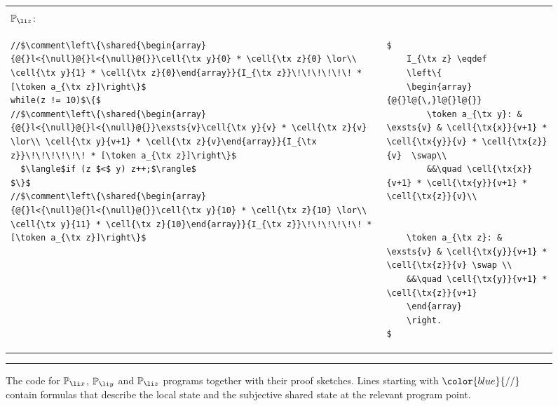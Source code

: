 \begin{figure}
\begin{tabular}{@{} l @{\hspace{15pt}} l@{\ }}
&\vspace{-5pt}\\
{$\mathbb{P}_{\li z}$:}&  \vspace{-10pt}\\
\begin{lstlisting}
//$\comment\left\{\shared{\begin{array}{@{}l<{\null}@{}l<{\null}@{}}\cell{\tx y}{0} * \cell{\tx z}{0} \lor\\ \cell{\tx y}{1} * \cell{\tx z}{0}\end{array}}{I_{\tx z}}\!\!\!\!\!\! * [\token a_{\tx z}]\right\}$
while(z != 10)$\{$
//$\comment\left\{\shared{\begin{array}{@{}l<{\null}@{}l<{\null}@{}}\exsts{v}\cell{\tx y}{v} * \cell{\tx z}{v} \lor\\ \cell{\tx y}{v+1} * \cell{\tx z}{v}\end{array}}{I_{\tx z}}\!\!\!\!\!\! * [\token a_{\tx z}]\right\}$
  $\langle$if (z $<$ y) z++;$\rangle$
$\}$
//$\comment\left\{\shared{\begin{array}{@{}l<{\null}@{}l<{\null}@{}}\cell{\tx y}{10} * \cell{\tx z}{10} \lor\\ \cell{\tx y}{11} * \cell{\tx z}{10}\end{array}}{I_{\tx z}}\!\!\!\!\!\! * [\token a_{\tx z}]\right\}$
\end{lstlisting}
&
\begin{lstlisting}
$
	I_{\tx z} \eqdef 
	\left\{
	\begin{array}{@{}l@{\,}l@{}l@{}} 
		\token a_{\tx y}: & \exsts{v} & \cell{\tx{x}}{v+1} * \cell{\tx{y}}{v} * \cell{\tx{z}}{v}  \swap\\
		&&\quad \cell{\tx{x}}{v+1} * \cell{\tx{y}}{v+1} * \cell{\tx{z}}{v}\\
		
    
    \token a_{\tx z}: & \exsts{v} & \cell{\tx{y}}{v+1} * \cell{\tx{z}}{v} \swap \\
    &&\quad \cell{\tx{y}}{v+1} * \cell{\tx{z}}{v+1} 
	\end{array}
	\right.
$
\end{lstlisting}
\end{tabular}
\vspace{3pt}\hrule\vspace{0pt}
\caption{The code for $\mathbb{P}_{\li x}$, $\mathbb{P}_{\li y}$ and $\mathbb{P}_{\li z}$ programs together with their \colosl proof sketches. Lines starting with $\color{blue}{//}$ contain formulas that describe the local state and the subjective shared state at the relevant program point.}
\label{fig:concurrentInc2}
\end{figure}

